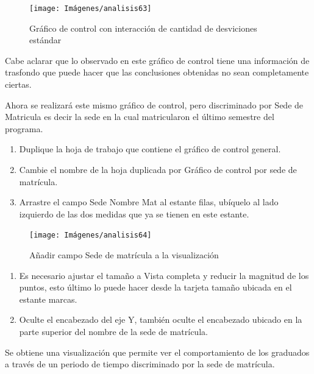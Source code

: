 \documentclass[
]{book}
\begin{document}
\begin{figure}

{\centering \texttt{[image: Imágenes/analisis63]} 

}

\caption{Gráfico de control con interacción de cantidad de desviciones estándar}\label{fig:graficodecontrol-fig}
\end{figure}

Cabe aclarar que lo observado en este gráfico de control tiene una información de trasfondo que puede hacer que las conclusiones obtenidas no sean completamente ciertas.

Ahora se realizará este mismo gráfico de control, pero discriminado por Sede de Matricula es decir la sede en la cual matricularon el último semestre del programa.

\begin{enumerate}
\def\labelenumi{\arabic{enumi}.}
\item
  Duplique la hoja de trabajo que contiene el gráfico de control general.
\item
  Cambie el nombre de la hoja duplicada por Gráfico de control por sede de matrícula.
\item
  Arrastre el campo Sede Nombre Mat al estante filas, ubíquelo al lado izquierdo de las dos medidas que ya se tienen en este estante.
\end{enumerate}

\begin{figure}

{\centering \texttt{[image: Imágenes/analisis64]} 

}

\caption{Añadir campo Sede de matrícula a la visualización}\label{fig:paso3controlsede-fig}
\end{figure}

\begin{enumerate}
\def\labelenumi{\arabic{enumi}.}
\setcounter{enumi}{3}
\item
  Es necesario ajustar el tamaño a Vista completa y reducir la magnitud de los puntos, esto último lo puede hacer desde la tarjeta tamaño ubicada en el estante marcas.
\item
  Oculte el encabezado del eje Y, también oculte el encabezado ubicado en la parte superior del nombre de la sede de matrícula.
\end{enumerate}

Se obtiene una visualización que permite ver el comportamiento de los graduados a través de un periodo de tiempo discriminado por la sede de matrícula.
\end{document}
